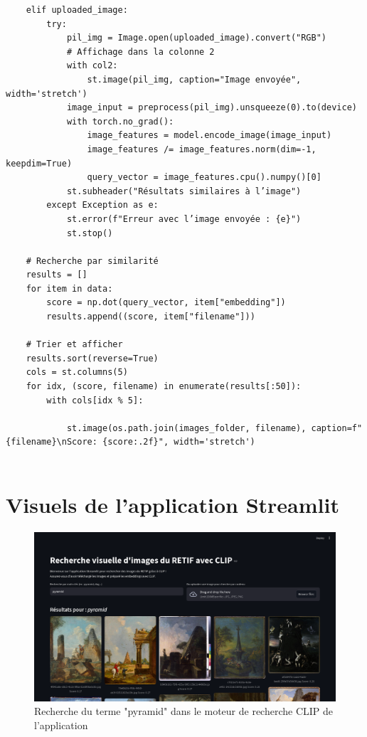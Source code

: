 \begin{verbatim}
    elif uploaded_image:
        try:
            pil_img = Image.open(uploaded_image).convert("RGB")
            # Affichage dans la colonne 2
            with col2:
                st.image(pil_img, caption="Image envoyée", width='stretch')
            image_input = preprocess(pil_img).unsqueeze(0).to(device)
            with torch.no_grad():
                image_features = model.encode_image(image_input)
                image_features /= image_features.norm(dim=-1, keepdim=True)
                query_vector = image_features.cpu().numpy()[0]
            st.subheader("Résultats similaires à l’image")
        except Exception as e:
            st.error(f"Erreur avec l’image envoyée : {e}")
            st.stop()

    # Recherche par similarité
    results = []
    for item in data:
        score = np.dot(query_vector, item["embedding"])
        results.append((score, item["filename"]))

    # Trier et afficher
    results.sort(reverse=True)
    cols = st.columns(5)
    for idx, (score, filename) in enumerate(results[:50]):
        with cols[idx % 5]:

            st.image(os.path.join(images_folder, filename), caption=f"{filename}\nScore: {score:.2f}", width='stretch')
            
\end{verbatim}


\section{Visuels de l'application Streamlit}

\begin{figure}[H]
    \centering
    \includegraphics[width=1\textwidth]{annexes/figures/APP-pyramid.png}
    \caption{Recherche du terme "pyramid" dans le moteur de recherche CLIP de l'application}
    \label{fig:APP-pyramid}
\end{figure}

